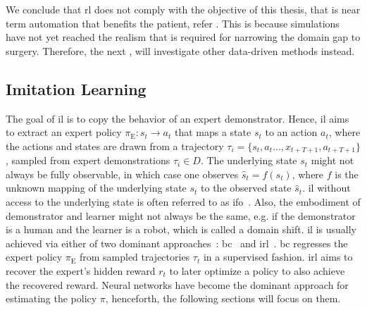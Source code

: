 We conclude that \gls{rl} does not comply with the objective of this thesis, that is near term automation that benefits the patient, refer . This is because simulations have not yet reached the realism that is required for narrowing the domain gap to surgery. Therefore, the next , will investigate other data-driven methods instead.

\subsection{Imitation Learning}
\label{in:sec:imitation_learning}
The goal of \gls{il} is to copy the behavior of an expert demonstrator. Hence, \gls{il} aims to extract an expert policy $\pi_\text{E}: s_t \rightarrow a_t$ that maps a state $s_t$ to an action $a_t$, where the actions and states are drawn from a trajectory $\tau_i = \{s_t,a_t...,x_{t+T+1},a_{t+T+1}\}$, sampled from expert demonstrations $\tau_i \in D$. The underlying state $s_t$ might not always be fully observable, in which case one observes $\hat{s}_t = f(s_t)$, where $f$ is the unknown mapping of the underlying state $s_t$ to the observed state $\hat{s}_t$. \gls{il} without access to the underlying state is often referred to as \gls{ifo}~\cite{liu2018imitation}. Also, the embodiment of demonstrator and learner might not always be the same, e.g. if the demonstrator is a human and the learner is a robot, which is called a domain shift. \gls{il} is usually achieved via either of two dominant approaches~\cite{osa2018algorithmic}: \gls{bc}~\cite{pomerleau1991efficient} and \gls{irl}~\cite{ng2000algorithms}. \gls{bc} regresses the expert policy $\pi_\text{E}$ from sampled trajectories $\tau_t$ in a supervised fashion. \gls{irl} aims to recover the expert's hidden reward $r_t$ to later optimize a policy to also achieve the recovered reward. Neural networks have become the dominant approach for estimating the policy $\pi$, henceforth, the following sections will focus on them.

